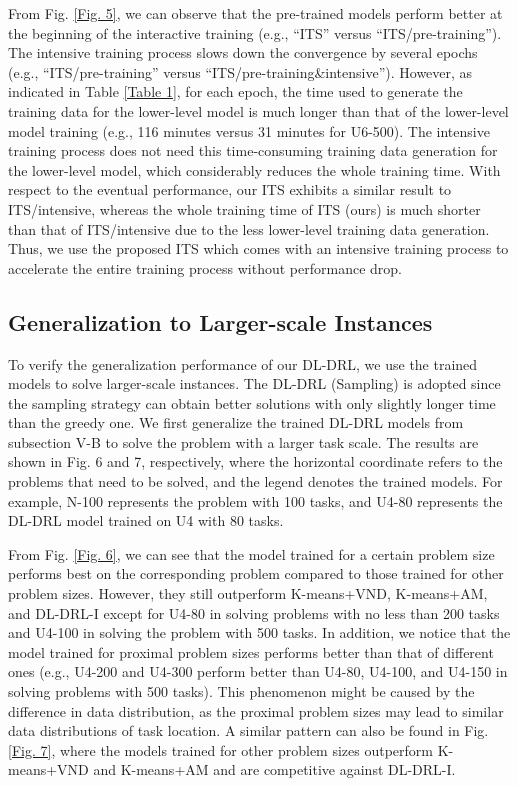 \documentclass[lettersize,journal]{IEEEtran}
\begin{document}
	From Fig. \ref{Fig. 5}, we can observe that the pre-trained models perform better at the beginning of the interactive training (e.g., “ITS” versus “ITS/pre-training”). The intensive training process slows down the convergence by several epochs (e.g., “ITS/pre-training” versus “ITS/pre-training\&intensive”). However, as indicated in Table \ref{Table 1}, for each epoch, the time used to generate the training data for the lower-level model is much longer  than that of the lower-level model training (e.g., 116 minutes versus 31 minutes for U6-500). The intensive training process does not need this time-consuming training data generation for the lower-level model, which considerably reduces the whole training time. With respect to the eventual performance, our ITS exhibits a similar result to ITS/intensive, whereas the whole training time of ITS (ours) is much shorter than that of ITS/intensive due to the less lower-level training data generation. Thus, we use the proposed ITS which comes with an intensive training process to accelerate the entire training process without performance drop.
	
	
	\subsection{Generalization to Larger-scale Instances}
	
	To verify the generalization performance of our DL-DRL, we use the trained models to solve larger-scale instances. The DL-DRL (Sampling) is adopted since the sampling strategy can obtain better solutions with only slightly longer time than the greedy one. We first generalize the trained DL-DRL models from subsection V-B to solve the problem with a larger task scale. The results are shown in Fig. 6 and 7, respectively, where the horizontal coordinate refers to the problems that need to be solved, and the legend denotes the trained models. For example, N-100 represents the problem with 100 tasks, and U4-80 represents the DL-DRL model trained on U4 with 80 tasks.
	
	From Fig. \ref{Fig. 6}, we can see that the model trained for a certain problem size performs best on the corresponding problem compared to those trained for other problem sizes. However, they still outperform K-means+VND, K-means+AM, and DL-DRL-I except for U4-80 in solving problems with no less than 200 tasks and U4-100 in solving the problem with 500 tasks. In addition, we notice that the model trained for proximal problem sizes performs better than that of different ones (e.g., U4-200 and U4-300 perform better than U4-80, U4-100, and U4-150 in solving problems with 500 tasks). This phenomenon might be caused by the difference in data distribution, as the proximal problem sizes may lead to similar data distributions of task location. A similar pattern can also be found in Fig. \ref{Fig. 7}, where the models trained for other problem sizes outperform K-means+VND and K-means+AM and are competitive against DL-DRL-I.
	
\end{document}
